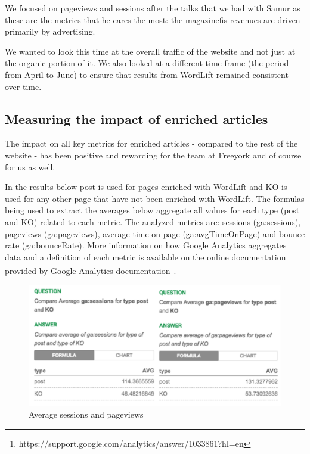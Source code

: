 \documentclass[runningheads,a4paper]{llncs}
\makeatletter
\def\maxwidth#1{\ifdim\Gin@nat@width>#1 #1\else\Gin@nat@width\fi}
\makeatother
\begin{document}
We focused on pageviews and sessions after the talks that we
 had with Samur as these are the metrics that he cares the most: the
 magazinefis revenues are driven primarily by advertising.

We wanted to look this time at the overall traffic of the website
 and not just at the organic portion of it. We also looked at a different
 time frame (the period from April to June) to ensure that results
 from WordLift remained consistent over time.

\subsection{Measuring the impact of enriched articles}

The impact on all key metrics for enriched articles - compared to
 the rest of the website - has been positive and rewarding for the
 team at Freeyork and of course for us as well.

In the results below post is used for pages enriched with WordLift
 and KO is used for any other page that have not been enriched with
 WordLift. The formulas being used to extract the averages below
 aggregate all values for each type (post and KO) related to each metric. The analyzed metrics are: sessions (ga:sessions), pageviews
 (ga:pageviews), average time on page (ga:avgTimeOnPage) and
 bounce rate (ga:bounceRate). More information on how Google
 Analytics aggregates data and a definition of each metric is available on the online documentation provided by Google Analytics
documentation\footnote{https://support.google.com/analytics/answer/1033861?hl=en}.
\begin{figure}[h!]
\centering
\includegraphics[width=\maxwidth{\textwidth}]{img/10000201000004CE0000024D28D8B27F.png}
\cprotect\caption{Average sessions and pageviews}
\label{}
\end{figure}
\end{document}

